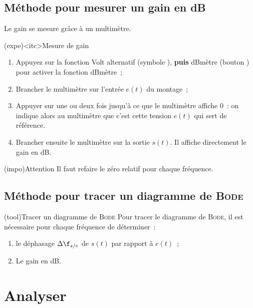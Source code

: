 \documentclass[../main/main.tex]{subfiles}
\begin{document}
{	\subsection{Méthode pour mesurer un gain en dB}

	Le gain se mesure grâce à un multimètre.
	\begin{tcb}(expe)<itc>{Mesure de gain}
		\begin{enumerate}
			\item Appuyez sur la fonction Volt alternatif (symbole
			      ), \textbf{puis} dBmètre (bouton ) pour
			      activer la fonction dBmètre~;
			\item Brancher le multimètre sur l'entrée $e(t)$ du montage~;
			\item Appuyer sur  une ou deux fois jusqu'à ce que le
			      multimètre affiche 0~: on indique alors au multimètre que c'est
			      cette tension $e(t)$ qui sert de référence.
			\item Brancher ensuite le multimètre sur la sortie $s(t)$. Il affiche
			      directement le gain en dB.
		\end{enumerate}
		\begin{center}
			\begin{tcb}[cnt, bld, width=.8\linewidth](impo){Attention}
				Il faut refaire le zéro relatif pour chaque fréquence.
			\end{tcb}
		\end{center}
	\end{tcb}

	\subsection{Méthode pour tracer un diagramme de \textsc{Bode}}

	\begin{tcb}(tool){Tracer un diagramme de \textsc{Bode}}
		Pour tracer le diagramme de \textsc{Bode}, il est nécessaire pour chaque
		fréquence de déterminer~:
		\begin{enumerate}
			\item le déphasage $\Delta\f_{s/e}$ de $s(t)$ par rapport à $e(t)$~;
			\item Le gain en dB.
		\end{enumerate}
	\end{tcb}
}%

\setcounter{section}{2}
\section{Analyser}
\end{document}
